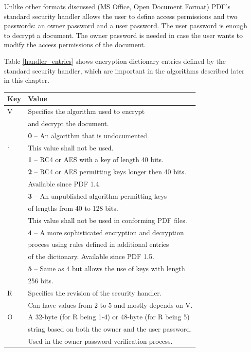 \documentclass[11pt,oneside]{fithesis2}
\begin{document}
Unlike other formats discussed (MS Office, Open Document Format) PDF's standard security handler allows the user to define access permissions and two passwords: an owner password and a user password. The user password is enough to decrypt a document. The owner password is needed in case the user wants to modify the access permissions of the document.

Table \ref{handler_entries} shows encryption dictionary entries defined by the standard security handler, which are important in the algorithms described later in this chapter.

\begin{table}[hp]
	\centering
	\begin{tabular}{|l|l|}
               	\hline
		\textbf{Key}&\textbf{Value}\\
		\hline
		V&Specifies the algorithm used to encrypt \\
		&and decrypt the document.\\
		&\textbf{0} -- An algorithm that is undocumented.\\
	`	&This value shall not be used.\\
		&\textbf{1} -- RC4 or AES with a key of length 40 bits.\\
		&\textbf{2} -- RC4 or AES permitting keys longer then 40 bits.\\
		&Available since PDF 1.4.\\
		&\textbf{3} -- An unpublished algorithm permitting keys\\
		&of lengths from 40 to 128 bits.\\
		&This value shall not be used in conforming PDF files.\\
		&\textbf{4} -- A more sophisticated encryption and decryption\\
		&process using rules defined in additional entries\\
		&of the dictionary. Available since PDF 1.5.\\
		&\textbf{5} -- Same as 4 but allows the use of keys with length\\
		&256 bits.\\
	\hline
		R&Specifies the revision of the security handler.\\
		&Can have values from 2 to 5 and mostly depends on V.\\
	\hline
		O&A 32-byte (for R being 1-4) or 48-byte (for R being 5)\\ 
		&string based on both the owner and the user password.\\
		&Used in the owner password verification process.\\

\end{tabular}
\end{table}
\end{document}

